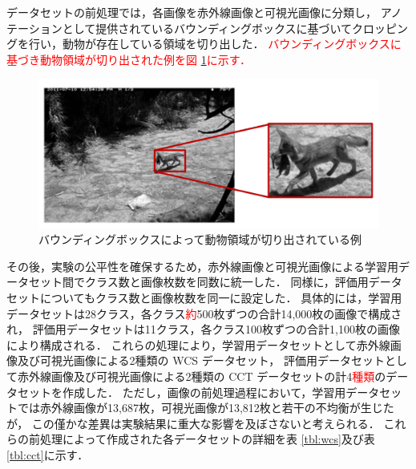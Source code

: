 \documentclass[a4paper,11pt,nomag]{jsreport}
\begin{document}
データセットの前処理では，各画像を赤外線画像と可視光画像に分類し，
アノテーションとして提供されているバウンディングボックスに基づいてクロッピングを行い，動物が存在している領域を切り出した．
\textcolor{red}{バウンディングボックスに基づき動物領域が切り出された例を図 \ref{fig:cropping}に示す．}
% 
\begin{figure}[tbp]
  \centering
  \includegraphics[width=\linewidth, keepaspectratio]{image/cropping.png}
  \caption{バウンディングボックスによって動物領域が切り出されている例}
  \label{fig:cropping}
\end{figure}
% 
その後，実験の公平性を確保するため，赤外線画像と可視光画像による学習用データセット間でクラス数と画像枚数を同数に統一した．
同様に，評価用データセットについてもクラス数と画像枚数を同一に設定した．
具体的には，学習用データセットは28クラス，各クラス\textcolor{red}{約}500枚ずつの合計14,000枚の画像で構成され，
評価用データセットは11クラス，各クラス100枚ずつの合計1,100枚の画像により構成される．
これらの処理により，学習用データセットとして赤外線画像及び可視光画像による2種類の WCS データセット，
評価用データセットとして赤外線画像及び可視光画像による2種類の CCT データセットの計4\textcolor{red}{種類}のデータセットを作成した．
ただし，画像の前処理過程において，学習用データセットでは赤外線画像が13,687枚，可視光画像が13,812枚と若干の不均衡が生じたが，
この僅かな差異は実験結果に重大な影響を及ぼさないと考えられる．
これらの前処理によって作成された各データセットの詳細を表 \ref{tbl:wcs}及び表 \ref{tbl:cct}に示す．
\end{document}
